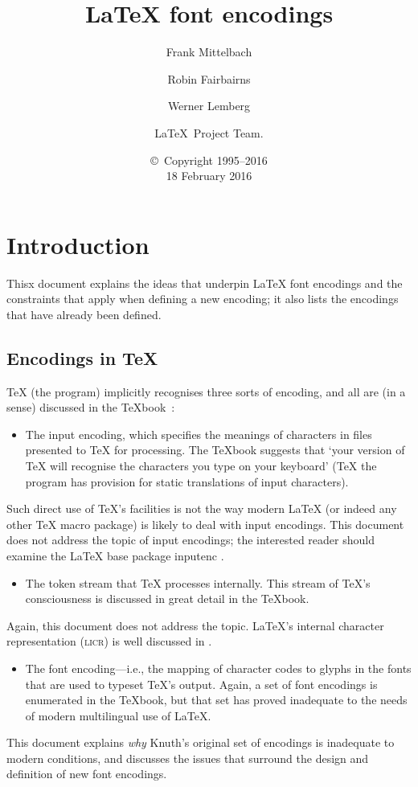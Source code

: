 \documentclass{ltxguide}[1994/11/20]
\title{\LaTeX{} font encodings}
\author{Frank Mittelbach \and Robin
   Fairbairns \and Werner Lemberg \and \LaTeX\ Project Team.}
\date{\copyright~Copyright 1995--2016 \\[5pt] 18 February 2016}
\providecommand{\Pkg}[1]{%
  \textsf{#1}}
\begin{document}
\maketitle

\tableofcontents

\section{Introduction}

Thisx document explains the ideas that underpin \LaTeX{} font
encodings and the constraints that apply when defining a new encoding; it
also lists the encodings that have already been defined.

\subsection{Encodings in \TeX{}}

\TeX{} (the program) implicitly recognises three sorts of encoding,
and all are (in a sense) discussed in the \TeX{}book~\cite{A-W:DKn86}:
\begin{itemize}
\item[1.] The input encoding, which specifies the meanings of characters
  in files presented to \TeX{} for processing.  The \TeX{}book
  suggests that `your version of \TeX{} will recognise the characters
  you type on your keyboard' (\TeX{} the program has provision for
  static translations of input characters).
\end{itemize}
Such direct use of \TeX{}'s facilities is not the way modern
\LaTeX{} (or indeed any other \TeX{} macro package) is likely to deal
with input encodings.   This document does not address the topic of
input encodings; the interested reader should examine the \LaTeX{}
base package \Pkg{inputenc} \cite[sec.~7.5.2, p.~357]{A-W:MG2004}.
\begin{itemize}
\item[2.] The token stream that \TeX{} processes internally.  This stream
  of \TeX{}'s consciousness is discussed in great detail in the
  \TeX{}book.
\end{itemize}
Again, this document does not address the topic.  \LaTeX's internal
character representation (\textsc{licr}) is well discussed in
\cite[sec.~7.11.2, p.~442]{A-W:MG2004}.
\begin{itemize}
\item[3.] The font encoding---i.e., the mapping of character codes to
  glyphs in the fonts that are used to typeset \TeX{}'s output.
  Again, a set of font encodings is enumerated in the \TeX{}book, but
  that set has proved inadequate to the needs of modern multilingual
  use of \LaTeX.
\end{itemize}
This document explains \emph{why} Knuth's original set of encodings is
inadequate to modern conditions, and discusses the issues that
surround the design and definition of new font encodings.
\end{document}
